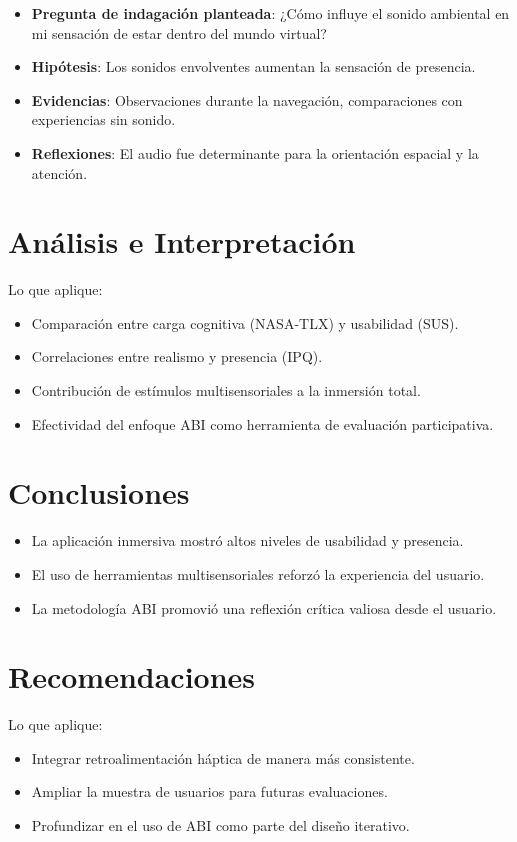 \documentclass[12pt]{article}
\begin{document}
\begin{itemize}
    \item \textbf{Pregunta de indagación planteada}: ¿Cómo influye el sonido ambiental en mi sensación de estar dentro del mundo virtual?
    \item \textbf{Hipótesis}: Los sonidos envolventes aumentan la sensación de presencia.
    \item \textbf{Evidencias}: Observaciones durante la navegación, comparaciones con experiencias sin sonido.
    \item \textbf{Reflexiones}: El audio fue determinante para la orientación espacial y la atención.
\end{itemize}

\section{Análisis e Interpretación}

Lo que aplique:

\begin{itemize}
    \item Comparación entre carga cognitiva (NASA-TLX) y usabilidad (SUS).
    \item Correlaciones entre realismo y presencia (IPQ).
    \item Contribución de estímulos multisensoriales a la inmersión total.
    \item Efectividad del enfoque ABI como herramienta de evaluación participativa.
\end{itemize}

\section{Conclusiones}
\begin{itemize}
    \item La aplicación inmersiva mostró altos niveles de usabilidad y presencia.
    \item El uso de herramientas multisensoriales reforzó la experiencia del usuario.
    \item La metodología ABI promovió una reflexión crítica valiosa desde el usuario.
\end{itemize}

\section{Recomendaciones}
Lo que aplique:
\begin{itemize}
    \item Integrar retroalimentación háptica de manera más consistente.
    \item Ampliar la muestra de usuarios para futuras evaluaciones.
    \item Profundizar en el uso de ABI como parte del diseño iterativo.
\end{itemize}
\end{document}
